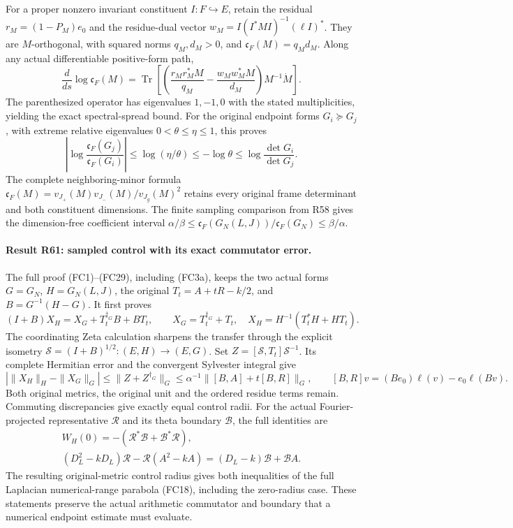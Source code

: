 For a proper nonzero invariant constituent $I:F\hookrightarrow E$,
retain the residual $r_M=(1-P_M)e_0$ and the residue-dual vector
$w_M=I(I^*MI)^{-1}(\ell I)^*$. They are $M$-orthogonal, with
squared norms $q_M,d_M>0$, and
$\mathfrak c_F(M)=q_Md_M$. Along any actual differentiable
positive-form path,
\[
 \frac{d}{ds}\log\mathfrak c_F(M)
 =\operatorname{Tr}\left[
   \left(\frac{r_Mr_M^*M}{q_M}-\frac{w_Mw_M^*M}{d_M}\right)
                  M^{-1}\dot M\right].
\]
The parenthesized operator has eigenvalues $1,-1,0$ with the
stated multiplicities, yielding the exact spectral-spread bound.
For the original endpoint forms $G_i\succeq G_j$, with extreme
relative eigenvalues $0<\theta\le\eta\le1$, this proves
\[
 \left|\log\frac{\mathfrak c_F(G_j)}{\mathfrak c_F(G_i)}\right|
 \le\log(\eta/\theta)\le-\log\theta
 \le\log\frac{\det G_i}{\det G_j}.
\]
The complete neighboring-minor formula
$\mathfrak c_F(M)=v_{J_+}(M)v_{J_-}(M)/v_{J_g}(M)^2$
retains every original frame determinant and both constituent
dimensions. The finite sampling comparison from R58 gives the
dimension-free coefficient interval
$\alpha/\beta\le\mathfrak c_F(G_N(L,J))/\mathfrak c_F(G_N)
\le\beta/\alpha$.

\paragraph{Result R61: sampled control with its exact commutator error.}
The full proof (FC1)--(FC29), including (FC3a), keeps the two actual
forms $G=G_N$, $H=G_N(L,J)$, the original
$T_t=A+tR-k/2$, and $B=G^{-1}(H-G)$. It first proves
\[
 (I+B)X_H=X_G+T_t^{\dagger_G}B+BT_t,
 \qquad X_G=T_t^{\dagger_G}+T_t,
 \quad X_H=H^{-1}(T_t^*H+HT_t).
\]
The coordinating Zeta calculation sharpens the transfer through
the explicit isometry $\mathcal S=(I+B)^{1/2}:(E,H)\to(E,G)$.
Set $Z=[\mathcal S,T_t]\mathcal S^{-1}$. Its complete Hermitian
error and the convergent Sylvester integral give
\[
 \left|\|X_H\|_H-\|X_G\|_G\right|
 \le\|Z+Z^{\dagger_G}\|_G
 \le\alpha^{-1}\|[B,A]+t[B,R]\|_G,
 \qquad [B,R]v=(Be_0)\ell(v)-e_0\ell(Bv).
\]
Both original metrics, the original unit and the ordered residue
terms remain. Commuting discrepancies give exactly equal control
radii. For the actual Fourier-projected representative
$\mathscr R$ and its theta boundary $\mathscr B$, the full identities
are
\[
 \begin{gathered}
 W_H(0)=-(\mathscr R^*\mathscr B+\mathscr B^*\mathscr R),\\
 (D_L^2-kD_L)\mathscr R-\mathscr R(A^2-kA)
       =(D_L-k)\mathscr B+\mathscr BA.
 \end{gathered}
\]
The resulting original-metric control radius gives both inequalities
of the full Laplacian numerical-range parabola (FC18), including the
zero-radius case. These statements preserve the actual arithmetic
commutator and boundary that a numerical endpoint estimate must
evaluate.

